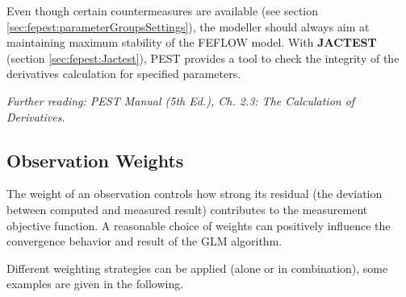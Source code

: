 Even though certain countermeasures are available (see section \ref{sec:fepest:parameterGroupsSettings}), the modeller should always aim at maintaining maximum stability of the FEFLOW model. With \textbf{JACTEST} (section \ref{sec:fepest:Jactest}), PEST provides a tool to check the integrity of the derivatives calculation for specified parameters. 


\textit{Further reading: PEST Manual (5th Ed.), Ch. 2.3: The Calculation of Derivatives.}

\subsection{Observation Weights}
\label{sec:fepest:observationWeights}

The weight of an observation controls how strong its residual (the deviation between computed and measured result) contributes to the measurement objective function. A reasonable choice of weights can positively influence the convergence behavior and result of the GLM algorithm.  

Different weighting strategies can be applied (alone or in combination), some examples are given in the following.


